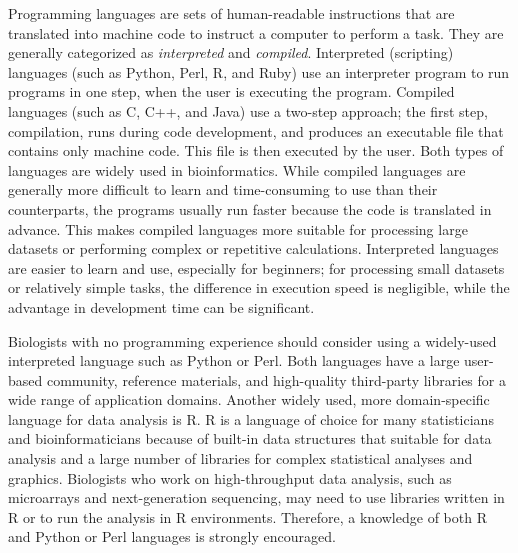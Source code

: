 \documentclass[ChapterTOCs,krantz2]{krantz} %
\begin{document}
Programming languages are sets of human-readable instructions that are translated into
machine code to instruct a computer to perform a task.
They are generally categorized as \emph{interpreted} and \emph{compiled}.
Interpreted (scripting) languages (such as Python, Perl, R, and Ruby) use an
interpreter program to run programs in one step, 
when the user is executing the
program. Compiled languages (such as C, C++, and Java)
use a two-step approach; the first step, compilation, runs 
during code development, and produces an executable file that
contains only machine code. This file is then executed by the user. 
Both types of languages are widely used in
bioinformatics. While compiled languages are generally more difficult to learn
and time-consuming to use than their counterparts, the 
programs usually run faster because the code is translated in advance.
This makes compiled languages more suitable for processing large
datasets or performing complex or repetitive calculations. Interpreted languages are
easier to learn and use, especially for beginners; for processing 
small datasets or relatively simple
tasks, the difference in execution speed is negligible, while the advantage
in development time can be significant.

Biologists with no programming experience should consider using a widely-used 
interpreted language such as Python or Perl.
Both languages have a large user-based community, reference materials, and
high-quality third-party libraries for a wide range of application domains.
Another widely used, more domain-specific language for data analysis is R.
R is a language of choice for many statisticians and bioinformaticians because of
built-in data structures that suitable for data analysis and a large number of
libraries for complex statistical analyses and graphics.
Biologists who work on high-throughput data analysis, such as microarrays and next-generation
sequencing, may need to use libraries written in R or to run the analysis in R environments.
Therefore, a knowledge of both R and Python or Perl languages is strongly encouraged.
\end{document}
